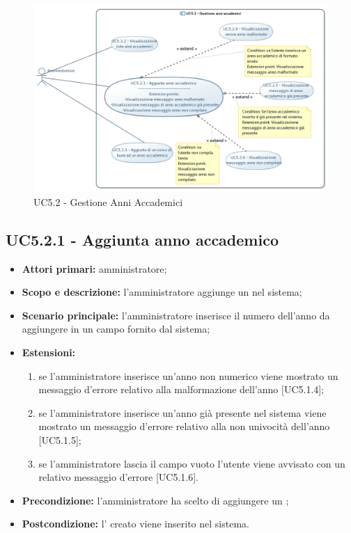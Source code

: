 \documentclass[AnalisiDeiRequisiti.tex]{subfiles}
\begin{document}
\begin{figure}[H]
	\centering
	\includegraphics[width=1.0\linewidth]{UC5_2.jpg}
	\caption{UC5.2 - Gestione Anni Accademici}
	\label{fig:UC5.2 - Gestione Anni Accademici}
\end{figure}

\subsection{UC5.2.1 - Aggiunta anno accademico}
\begin{itemize}
	\item \textbf{Attori primari:} amministratore;
	\item \textbf{Scopo e descrizione:} l'amministratore aggiunge un  nel sistema;
	\item \textbf{Scenario principale:} l'amministratore inserisce il numero dell'anno da aggiungere in un campo fornito dal sistema;
	\item \textbf{Estensioni:}
	\begin{enumerate}
		\item se l'amministratore inserisce un'anno non numerico viene mostrato un messaggio d'errore relativo alla malformazione dell'anno [UC5.1.4];
		\item se l'amministratore inserisce un'anno già presente nel sistema viene mostrato un messaggio d'errore relativo alla non univocità dell'anno [UC5.1.5];
		\item se l'amministratore lascia il campo vuoto l'utente viene avvisato con un relativo messaggio d'errore [UC5.1.6].
	\end{enumerate}
	\item \textbf{Precondizione:} l'amministratore ha scelto di aggiungere un ; 
	\item \textbf{Postcondizione:} l' creato viene inserito nel sistema.
\end{itemize}
\end{document}
